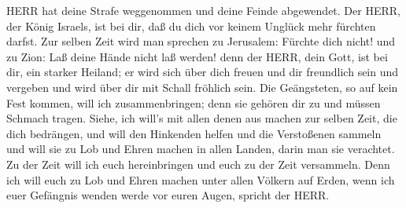 HERR hat deine Strafe weggenommen und deine Feinde abgewendet. Der HERR,
der König Israels, ist bei dir, daß du dich vor keinem Unglück mehr
fürchten darfst.  Zur selben Zeit wird man sprechen zu
Jerusalem: Fürchte dich nicht! und zu Zion: Laß deine Hände nicht laß
werden!  denn der HERR, dein Gott, ist bei dir, ein starker
Heiland; er wird sich über dich freuen und dir freundlich sein und
vergeben und wird über dir mit Schall fröhlich sein.  Die
Geängsteten, so auf kein Fest kommen, will ich zusammenbringen; denn sie
gehören dir zu und müssen Schmach tragen.  Siehe, ich
will's mit allen denen aus machen zur selben Zeit, die dich bedrängen,
und will den Hinkenden helfen und die Verstoßenen sammeln und will sie
zu Lob und Ehren machen in allen Landen, darin man sie verachtet.
 Zu der Zeit will ich euch hereinbringen und euch zu der
Zeit versammeln. Denn ich will euch zu Lob und Ehren machen unter allen
Völkern auf Erden, wenn ich euer Gefängnis wenden werde vor euren Augen,
spricht der HERR.
